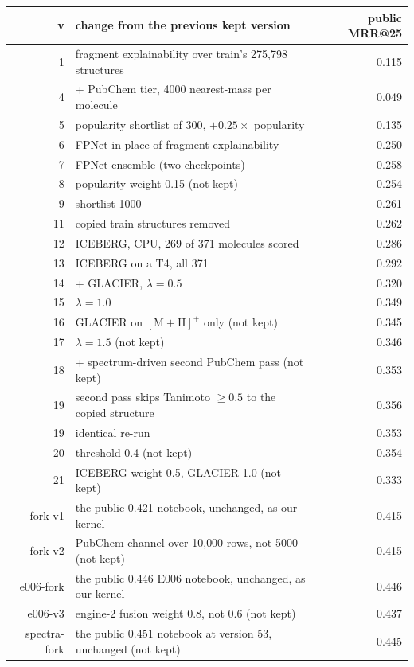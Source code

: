 \documentclass[11pt]{article}
\begin{document}
\begin{center}
\begin{tabular}{rlr}
\toprule
v & change from the previous kept version & public MRR@25 \\
\midrule
1  & fragment explainability over train's 275{,}798 structures & 0.115 \\
4  & + PubChem tier, 4000 nearest-mass per molecule & 0.049 \\
5  & popularity shortlist of 300, $+0.25\times$ popularity & 0.135 \\
6  & FPNet in place of fragment explainability & 0.250 \\
7  & FPNet ensemble (two checkpoints) & 0.258 \\
8  & popularity weight 0.15 (not kept) & 0.254 \\
9  & shortlist 1000 & 0.261 \\
11 & copied train structures removed & 0.262 \\
12 & ICEBERG, CPU, 269 of 371 molecules scored & 0.286 \\
13 & ICEBERG on a T4, all 371 & 0.292 \\
14 & + GLACIER, $\lambda = 0.5$ & 0.320 \\
15 & $\lambda = 1.0$ & 0.349 \\
16 & GLACIER on $[\mathrm{M{+}H}]^+$ only (not kept) & 0.345 \\
17 & $\lambda = 1.5$ (not kept) & 0.346 \\
18 & + spectrum-driven second PubChem pass (not kept) & 0.353 \\
19 & second pass skips Tanimoto $\geq 0.5$ to the copied structure & 0.356 \\
19 & identical re-run & 0.353 \\
20 & threshold 0.4 (not kept) & 0.354 \\
21 & ICEBERG weight 0.5, GLACIER 1.0 (not kept) & 0.333 \\
\midrule
fork-v1 & the public 0.421 notebook, unchanged, as our kernel & 0.415 \\
fork-v2 & PubChem channel over 10{,}000 rows, not 5000 (not kept) & 0.415 \\
\midrule
e006-fork & the public 0.446 E006 notebook, unchanged, as our kernel & 0.446 \\
e006-v3 & engine-2 fusion weight 0.8, not 0.6 (not kept) & 0.437 \\
spectra-fork & the public 0.451 notebook at version 53, unchanged (not kept) & 0.445 \\
\midrule

\end{tabular}
\end{center}
\end{document}
